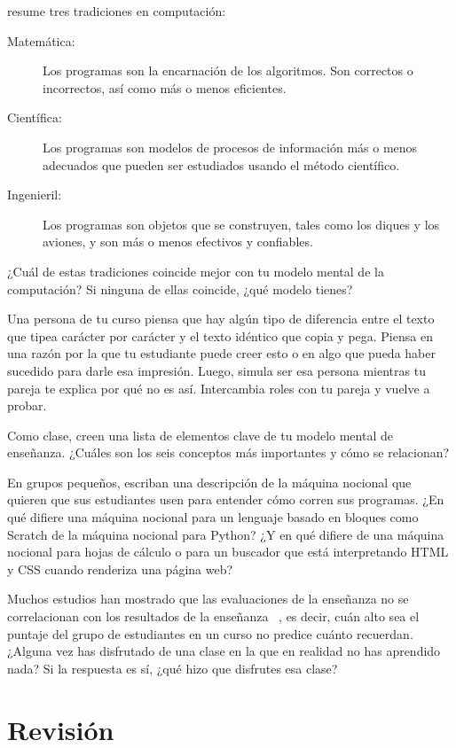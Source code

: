 
\cite{Tedr2008} resume tres tradiciones en computación:

\begin{description}

\item[Matemática:]
  Los programas son la encarnación de los algoritmos. 
Son correctos o incorrectos, así como más o menos eficientes. 

\item[Científica:]
Los programas son modelos de procesos de información más o menos adecuados
que pueden ser estudiados usando el método científico.

\item[Ingenieril:]
Los programas son objetos que se construyen, tales como los diques y los aviones,
y son más o menos efectivos y confiables.

\end{description}
¿Cuál de estas tradiciones coincide mejor con tu modelo mental de la computación?
Si ninguna de ellas coincide, ¿qué modelo tienes?

Una persona de tu curso piensa que hay algún tipo de diferencia entre el texto
que tipea carácter por carácter y el texto idéntico que copia y pega.
Piensa en una razón por la que tu estudiante puede creer esto
o en algo que pueda haber sucedido para darle esa impresión.
Luego, simula ser esa persona mientras tu pareja te explica por qué no es así.
Intercambia roles con tu pareja y vuelve a probar.


Como clase,
creen una lista de elementos clave de tu modelo mental de enseñanza.
¿Cuáles son los seis conceptos más importantes y cómo se relacionan?


En grupos pequeños,
escriban una descripción de la máquina nocional que quieren que sus estudiantes usen para entender cómo corren sus programas.
¿En qué difiere una máquina nocional para un lenguaje basado en bloques como Scratch de la máquina nocional para Python?
¿Y en qué difiere de una máquina nocional para hojas de cálculo o para un buscador que está interpretando HTML y CSS cuando renderiza una página web?

Muchos estudios han mostrado que
las evaluaciones de la enseñanza no se correlacionan con los resultados de la enseñanza ~\cite{Star2014,Uttl2017},
es decir, cuán alto sea el puntaje del grupo de estudiantes en un curso no predice cuánto recuerdan.
¿Alguna vez has disfrutado de una clase en la que en realidad no has aprendido nada?
Si la respuesta es sí, ¿qué hizo que disfrutes esa clase?

\newpage
\section*{Revisión}


